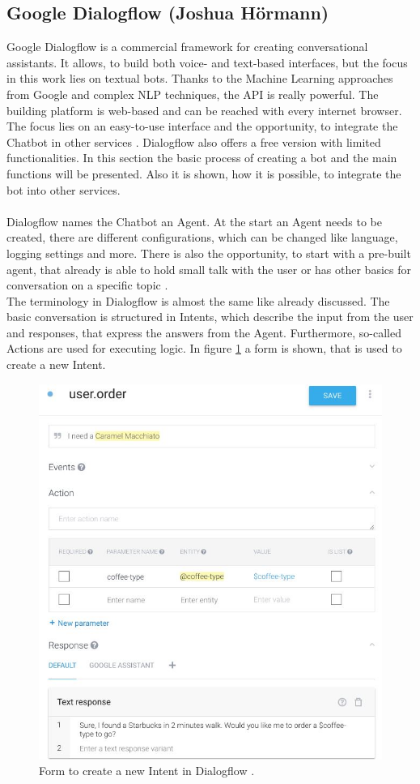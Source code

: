 \documentclass[10pt,final,journal,a4paper,oneside,twocolumn]{IEEEtran}
\begin{document}
\subsection{Google Dialogflow (Joshua Hörmann)}
Google Dialogflow is a commercial framework for creating conversational assistants. It allows, to build both voice- and text-based interfaces, but the focus in this work lies on textual bots. Thanks to the Machine Learning approaches from Google and complex NLP techniques, the API is really powerful. The building platform is web-based and can be reached with every internet browser. The focus lies on an easy-to-use interface and the opportunity, to integrate the Chatbot in other services \cite{b24}. Dialogflow also offers a free version with limited functionalities. In this section the basic process of creating a bot and the main functions will be presented. Also it is shown, how it is possible, to integrate the bot into other services.\\
\\
Dialogflow names the Chatbot an Agent. At the start an Agent needs to be created, there are different configurations, which can be changed like language, logging settings and more. There is also the opportunity, to start with a pre-built agent, that already is able to hold small talk with the user or has other basics for conversation on a specific topic \cite{b24}.\\
The terminology in Dialogflow is almost the same like already discussed. The basic conversation is structured in Intents, which describe the input from the user and responses, that express the answers from the Agent. Furthermore, so-called Actions are used for executing logic. In figure \ref{google} a form is shown, that is used to create a new Intent.  
\begin{figure}[htbp]
	\centerline{\includegraphics[width=1\linewidth]{pictures/google.jpg}}
	\caption{Form to create a new Intent in Dialogflow \cite{b24}.}
	\label{google}
\end{figure}
\end{document}
